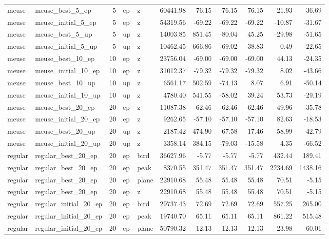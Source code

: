 \begin{tabular}{llrllrrrrrr}
meuse & meuse_best_5_ep & 5 & ep & z & 60441.98 & -76.15 & -76.15 & -76.15 & -21.93 & -36.69 \\
meuse & meuse_initial_5_ep & 5 & ep & z & 54319.56 & -69.22 & -69.22 & -69.22 & -10.87 & -31.67 \\
meuse & meuse_best_5_up & 5 & up & z & 14003.85 & 851.45 & -80.04 & 45.25 & -29.98 & -51.65 \\
meuse & meuse_initial_5_up & 5 & up & z & 10462.45 & 666.86 & -69.02 & 38.83 & 0.49 & -22.65 \\
meuse & meuse_best_10_ep & 10 & ep & z & 23756.04 & -69.00 & -69.00 & -69.00 & 44.13 & -24.35 \\
meuse & meuse_initial_10_ep & 10 & ep & z & 31012.37 & -79.32 & -79.32 & -79.32 & 8.02 & -43.66 \\
meuse & meuse_best_10_up & 10 & up & z & 6561.17 & 502.59 & -74.13 & 8.07 & 6.91 & -50.14 \\
meuse & meuse_initial_10_up & 10 & up & z & 4780.40 & 541.55 & -58.02 & 39.24 & 53.73 & -29.19 \\
meuse & meuse_best_20_ep & 20 & ep & z & 11087.38 & -62.46 & -62.46 & -62.46 & 49.96 & -35.78 \\
meuse & meuse_initial_20_ep & 20 & ep & z & 9262.65 & -57.10 & -57.10 & -57.10 & 82.63 & -18.53 \\
meuse & meuse_best_20_up & 20 & up & z & 2187.42 & 474.90 & -67.58 & 17.46 & 58.99 & -42.79 \\
meuse & meuse_initial_20_up & 20 & up & z & 3358.14 & 384.15 & -79.03 & -15.58 & 4.35 & -66.52 \\
regular & regular_best_20_ep & 20 & ep & bird & 36627.96 & -5.77 & -5.77 & -5.77 & 432.44 & 189.41 \\
regular & regular_best_20_ep & 20 & ep & peak & 8370.55 & 351.47 & 351.47 & 351.47 & 2234.69 & 1438.16 \\
regular & regular_best_20_ep & 20 & ep & plane & 22910.68 & 55.48 & 55.48 & 55.48 & 70.51 & -5.15 \\
regular & regular_best_20_ep & 20 & ep & z & 22910.68 & 55.48 & 55.48 & 55.48 & 70.51 & -5.15 \\
regular & regular_initial_20_ep & 20 & ep & bird & 29737.43 & 72.69 & 72.69 & 72.69 & 557.25 & 265.00 \\
regular & regular_initial_20_ep & 20 & ep & peak & 19740.70 & 65.11 & 65.11 & 65.11 & 861.22 & 515.48 \\
regular & regular_initial_20_ep & 20 & ep & plane & 50790.32 & 12.13 & 12.13 & 12.13 & -23.98 & -60.01 \\

\end{tabular}

